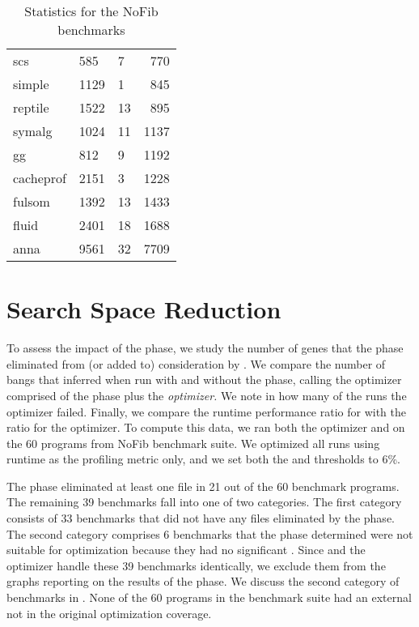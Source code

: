 \begin{table}[!htb]
\begin{minipage}{.5\linewidth}
\begin{tabular}{lllr}
            scs         &   585 &   7   &   770\\
            simple      &   1129&   1   &   845\\
            reptile     &   1522&   13  &   895\\
            symalg      &   1024&   11  &   1137\\
            gg          &   812 &   9   &   1192\\
            cacheprof   &   2151&   3   &   1228\\
            fulsom      &   1392&   13  &   1433\\
            fluid       &   2401&   18  &   1688\\
            anna        &   9561&   32  &   7709\\
        \end{tabular}
    \end{minipage} 
    \caption{Statistics for the NoFib benchmarks}
\label{tab:nofib-list}
\end{table}


\section{\Preopt{} Search Space Reduction}

To assess the impact of the \preopt{} phase, we study the number of
genes that the phase eliminated from (or added to) consideration by \Ao{}.
We compare the number of bangs that \Ao{} inferred when run with and
without the \preopt{} phase, calling the optimizer comprised of
the \preopt{} phase plus \Ao{} the \textit{\Preopt{} optimizer.} We
note in how many of the runs the \Preopt{} optimizer failed.  Finally,
we compare the runtime performance ratio for \Ao{} with the ratio for
the \Preopt{} optimizer.
To compute this data, we ran both the \Preopt{} optimizer and \Ao{} on
the 60 programs from NoFib benchmark suite.  We optimized all runs 
using runtime as the profiling metric only, and we set both 
the \hotspotcost{} and \absim{} thresholds to 6\%.

The \preopt{} phase eliminated at least one file in 21 out of the 60 
benchmark programs.
The remaining 39 benchmarks fall into one of two categories.
The first category consists of 33 benchmarks that did not have any files
eliminated by the \preopt{} phase. The second category comprises
6 benchmarks that the \preopt{} phase determined were not suitable for
optimization because they had no significant \hotspots{}.
Since \Ao{} and the \Preopt{} optimizer handle these 39 benchmarks
identically, we exclude them from the graphs reporting on the results
of the \preopt{} phase. We discuss the second category of benchmarks in
. None of the 60 programs in the benchmark suite
had an external \hotspot{} not in the original optimization coverage.

